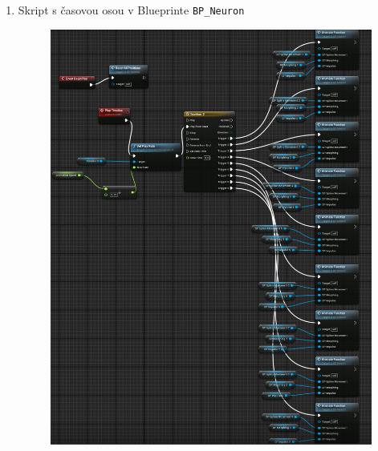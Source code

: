 \begin{enumerate}[leftmargin=*]
    \item Skript s časovou osou v Blueprinte \texttt{BP\_Neuron} \label{att:main-animate}
    \begin{figure}[!htbp]
        \centering
        \includegraphics[width=16cm]{img/main-animate.png}
    \end{figure}
    \newpage


\end{enumerate}
